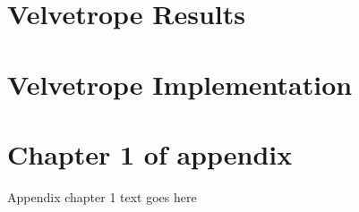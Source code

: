 \documentclass[phd,tocprelim]{cornell}
\begin{document}

\chapter{Velvetrope Results} %
\label{cha:Velvetrope Results}


\chapter{Velvetrope Implementation} %
\label{cha:Velvetrope Implementation}



\appendix
\chapter{Chapter 1 of appendix}
Appendix chapter 1 text goes here


\end{document}
